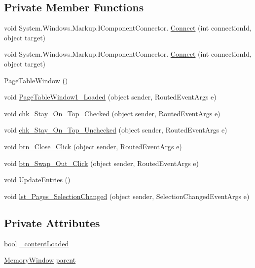 \subsection*{Private Member Functions}
\begin{DoxyCompactItemize}
\item 
void System.\+Windows.\+Markup.\+I\+Component\+Connector. \hyperlink{class_c_p_u___o_s___simulator_1_1_page_table_window_a5843f37edba076f17d15fe9f9f20d930}{Connect} (int connection\+Id, object target)
\item 
void System.\+Windows.\+Markup.\+I\+Component\+Connector. \hyperlink{class_c_p_u___o_s___simulator_1_1_page_table_window_a5843f37edba076f17d15fe9f9f20d930}{Connect} (int connection\+Id, object target)
\item 
\hyperlink{class_c_p_u___o_s___simulator_1_1_page_table_window_a9ddde0b8d78abd882007a4d919e5a082}{Page\+Table\+Window} ()
\item 
void \hyperlink{class_c_p_u___o_s___simulator_1_1_page_table_window_a32fcbb5d7acdefedbf7b81194f046f40}{Page\+Table\+Window1\+\_\+\+Loaded} (object sender, Routed\+Event\+Args e)
\item 
void \hyperlink{class_c_p_u___o_s___simulator_1_1_page_table_window_a4fca878351d58351729a016149ab037e}{chk\+\_\+\+Stay\+\_\+\+On\+\_\+\+Top\+\_\+\+Checked} (object sender, Routed\+Event\+Args e)
\item 
void \hyperlink{class_c_p_u___o_s___simulator_1_1_page_table_window_a7d678a6670baff37546ea625ae36a63c}{chk\+\_\+\+Stay\+\_\+\+On\+\_\+\+Top\+\_\+\+Unchecked} (object sender, Routed\+Event\+Args e)
\item 
void \hyperlink{class_c_p_u___o_s___simulator_1_1_page_table_window_ae072e4c12e228104c4e3b201c1c9d812}{btn\+\_\+\+Close\+\_\+\+Click} (object sender, Routed\+Event\+Args e)
\item 
void \hyperlink{class_c_p_u___o_s___simulator_1_1_page_table_window_a0a18aa563b2185c73dac319969a24c43}{btn\+\_\+\+Swap\+\_\+\+Out\+\_\+\+Click} (object sender, Routed\+Event\+Args e)
\item 
void \hyperlink{class_c_p_u___o_s___simulator_1_1_page_table_window_aea28126046f84b8a2cced2d22f21804d}{Update\+Entries} ()
\item 
void \hyperlink{class_c_p_u___o_s___simulator_1_1_page_table_window_ab6e40cd99ff3eedb1719774c9a123650}{lst\+\_\+\+Pages\+\_\+\+Selection\+Changed} (object sender, Selection\+Changed\+Event\+Args e)
\end{DoxyCompactItemize}
\subsection*{Private Attributes}
\begin{DoxyCompactItemize}
\item 
bool \hyperlink{class_c_p_u___o_s___simulator_1_1_page_table_window_a9c12d3a4ba2ab4b676cb502ca8caa6fe}{\+\_\+content\+Loaded}
\item 
\hyperlink{class_c_p_u___o_s___simulator_1_1_memory_window}{Memory\+Window} \hyperlink{class_c_p_u___o_s___simulator_1_1_page_table_window_a1903e0b83820829549f74207cd209337}{parent}
\end{DoxyCompactItemize}


